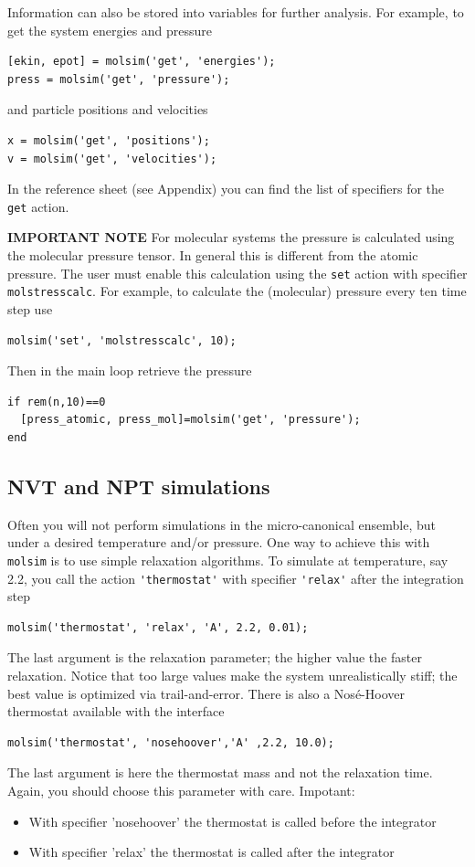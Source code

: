 \documentclass[11pt]{article}
\begin{document}
Information can also be stored into variables for further analysis. For example,
to get the system energies and pressure
\begin{verbatim}
[ekin, epot] = molsim('get', 'energies');
press = molsim('get', 'pressure');
\end{verbatim}
and particle positions and velocities
\begin{verbatim}
x = molsim('get', 'positions');
v = molsim('get', 'velocities');
\end{verbatim}
In the reference sheet (see Appendix) you can find the list of
specifiers for the \verb!get! action.


\textbf{IMPORTANT NOTE} For molecular systems the pressure is
calculated using the molecular pressure tensor. In general this is different
from the atomic pressure. The user must enable this calculation using the
\verb!set! action with specifier \verb!molstresscalc!. For example, to
calculate the (molecular) pressure every ten time step use
\begin{verbatim}
molsim('set', 'molstresscalc', 10);
\end{verbatim}
Then in the main loop retrieve the pressure
\begin{verbatim}
if rem(n,10)==0
  [press_atomic, press_mol]=molsim('get', 'pressure');
end
\end{verbatim}

\subsection{NVT and NPT simulations}
Often you will not perform simulations in the micro-canonical ensemble, but
under a desired temperature and/or pressure. One way to achieve this with
\verb!molsim! is to use simple relaxation algorithms. To simulate at
temperature, say 2.2, you call the action \verb!'thermostat'! with specifier
\verb!'relax'! after the integration step
\begin{verbatim}
molsim('thermostat', 'relax', 'A', 2.2, 0.01);
\end{verbatim}
The last argument is the relaxation parameter; the higher value the faster
relaxation. Notice that too large values make the system unrealistically
stiff; the best value is optimized via trail-and-error. There is also a
Nos\'{e}-Hoover thermostat available with the interface
\begin{verbatim}
molsim('thermostat', 'nosehoover','A' ,2.2, 10.0);
\end{verbatim}
The last argument is here the thermostat mass and not the relaxation
time. Again, you should choose this parameter with care. Impotant:
\begin{itemize}
\item With specifier \textsf{'nosehoover'} the thermostat is called before the
  integrator
\item 
  With specifier \textsf{'relax'} the thermostat is called after the
  integrator
\end{itemize}
  
\end{document}
